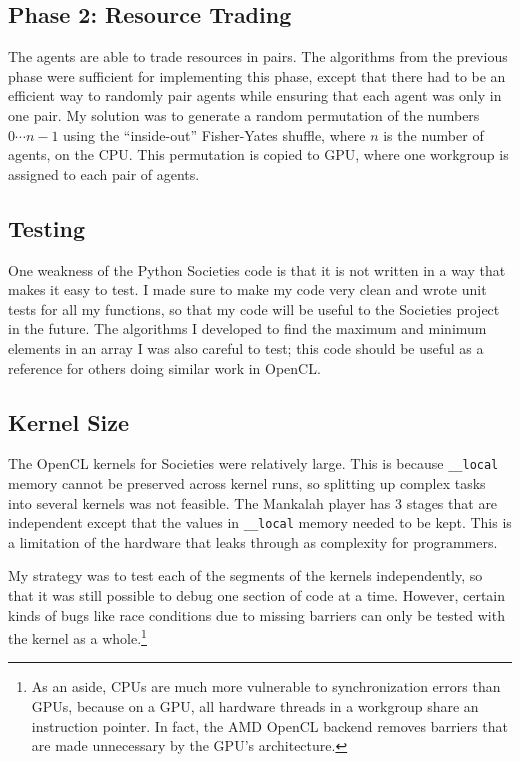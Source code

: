 \documentclass{article}
\begin{document}
\subsection{Phase 2: Resource Trading}
The agents are able to trade resources in pairs. The algorithms from the previous phase were sufficient for implementing this phase, except that there had to be an efficient way to randomly pair agents while ensuring that each agent was only in one pair. My solution was to generate a random permutation of the numbers $0 \cdots n-1$ using the ``inside-out'' Fisher-Yates shuffle, where $n$ is the number of agents, on the CPU. This permutation is copied to GPU, where one workgroup is assigned to each pair of agents.

\subsection{Testing}
One weakness of the Python Societies code is that it is not written in a way that makes it easy to test. I made sure to make my code very clean  and wrote unit tests for all my functions, so that my code will be useful to the Societies project in the future. The algorithms I developed to find the maximum and minimum elements in an array I was also careful to test; this code should be useful as a reference for others doing similar work in OpenCL.

\subsection{Kernel Size}
The OpenCL kernels for Societies were relatively large. This is because \texttt{\_\_local} memory cannot be preserved across kernel runs, so splitting up complex tasks into several kernels was not feasible. The Mankalah player has 3 stages that are independent except that the values in \texttt{\_\_local} memory needed to be kept. This is a limitation of the hardware that leaks through as complexity for programmers.

My strategy was to test each of the segments of the kernels independently, so that it was still possible to debug one section of code at a time. However, certain kinds of bugs like race conditions due to missing barriers can only be tested with the kernel as a whole.\footnote{As an aside, CPUs are much more vulnerable to synchronization errors than GPUs, because on a GPU, all hardware threads in a workgroup share an instruction pointer. In fact, the AMD OpenCL backend removes barriers that are made unnecessary by the GPU's architecture.}
\end{document}
